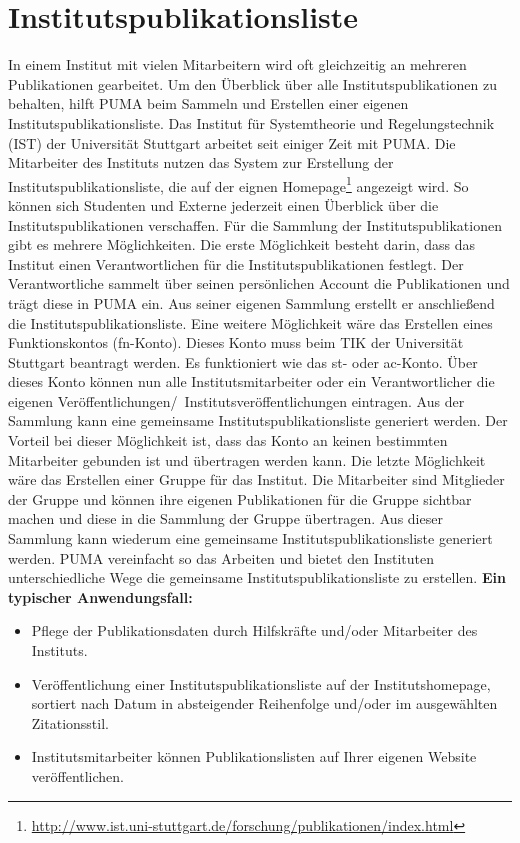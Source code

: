 \section{Institutspublikationsliste}
In einem Institut mit vielen Mitarbeitern wird oft gleichzeitig an mehreren Publikationen gearbeitet. Um den Überblick über alle Institutspublikationen zu behalten, hilft PUMA beim Sammeln und Erstellen einer eigenen Institutspublikationsliste. \newline
Das Institut für Systemtheorie und Regelungstechnik (IST) der Universität Stuttgart arbeitet seit einiger Zeit mit PUMA. Die Mitarbeiter des Instituts nutzen das System zur Erstellung der Institutspublikationsliste, die auf der eignen Homepage\footnote{\url{http://www.ist.uni-stuttgart.de/forschung/publikationen/index.html}} angezeigt wird. So können sich Studenten und Externe jederzeit einen Überblick über die Institutspublikationen verschaffen.\newline
Für die Sammlung der Institutspublikationen gibt es mehrere Möglichkeiten. Die erste Möglichkeit besteht darin, dass das Institut einen Verantwortlichen für  die Institutspublikationen festlegt. Der Verantwortliche sammelt über seinen persönlichen Account die Publikationen und trägt diese in PUMA ein. Aus seiner eigenen Sammlung erstellt er anschließend die Institutspublikationsliste. Eine weitere Möglichkeit wäre das Erstellen eines Funktionskontos (fn-Konto). Dieses Konto muss beim TIK der Universität Stuttgart beantragt werden. Es funktioniert wie das st- oder ac-Konto. Über dieses Konto können nun alle Institutsmitarbeiter oder ein Verantwortlicher die eigenen Veröffentlichungen/~Institutsveröffentlichungen eintragen. Aus der Sammlung kann eine gemeinsame Institutspublikationsliste generiert werden. Der Vorteil bei dieser Möglichkeit ist, dass das Konto an keinen bestimmten Mitarbeiter gebunden ist und übertragen werden kann. Die letzte Möglichkeit wäre das Erstellen einer Gruppe für das Institut. Die Mitarbeiter sind Mitglieder der Gruppe und können ihre eigenen Publikationen für die Gruppe sichtbar machen und diese in die Sammlung der Gruppe übertragen. Aus dieser  Sammlung kann wiederum eine gemeinsame Institutspublikationsliste generiert werden.\newline
PUMA vereinfacht so das Arbeiten und bietet den Instituten unterschiedliche Wege die gemeinsame Institutspublikationsliste zu erstellen.
\newline \newline
\textbf{Ein typischer Anwendungsfall:}
\begin{itemize}
\item Pflege der Publikationsdaten durch Hilfskräfte und/oder Mitarbeiter des Instituts.\newline\newline
\item Veröffentlichung einer Institutspublikationsliste auf der Institutshomepage, sortiert nach Datum in absteigender Reihenfolge und/oder im ausgewählten Zitationsstil.\newline\newline
\item Institutsmitarbeiter können Publikationslisten auf Ihrer eigenen Website veröffentlichen.
\end{itemize}
